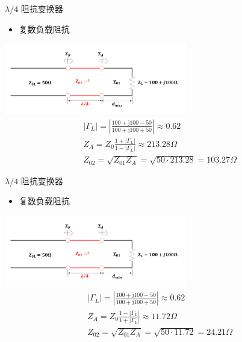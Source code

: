 \begin{frame}{$\lambda/4$ 阻抗变换器}
  \begin{itemize}
    \item 复数负载阻抗
  \end{itemize}
  \centering
  \includegraphics[width=8cm]{fig4-29.pdf}
  \begin{align*}
     & \lvert \Gamma_L \rvert = \left\lvert \frac{100+\mathrm{j}100-50}{100+\mathrm{j}100+50}\right\rvert \approx 0.62 \\
     & Z_A=Z_0 \frac{1+\lvert \Gamma_L\rvert}{1-\lvert \Gamma_L\rvert}\approx 213.28\Omega \\
     & Z_{02}=\sqrt{Z_{01}Z_A}=\sqrt{50\cdot 213.28}=103.27\Omega
  \end{align*}
\end{frame}

\begin{frame}{$\lambda/4$ 阻抗变换器}
  \begin{itemize}
    \item 复数负载阻抗
  \end{itemize}
  \centering
  \includegraphics[width=8cm]{fig4-30.pdf}
  \begin{align*}
     & \lvert \Gamma_L \rvert = \left\lvert \frac{100+\mathrm{j}100-50}{100+\mathrm{j}100+50}\right\rvert \approx 0.62 \\
     & Z_A=Z_0 \frac{1-\lvert \Gamma_L\rvert}{1+\lvert \Gamma_L\rvert}\approx 11.72\Omega \\
     & Z_{02}=\sqrt{Z_{01}Z_A}=\sqrt{50\cdot 11.72}=24.21\Omega
  \end{align*}
\end{frame}

